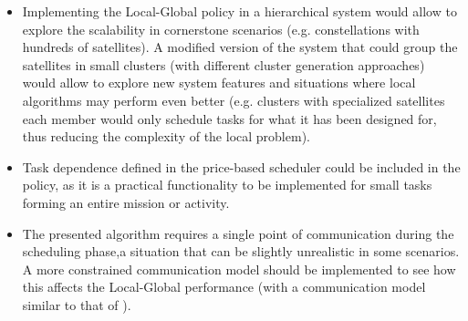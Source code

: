 \begin{itemize}
\item Implementing the Local-Global policy in a hierarchical system would allow to explore the scalability in cornerstone scenarios (e.g. constellations with hundreds of satellites). A modified version of the system that could group the satellites in small clusters (with different cluster generation approaches) would allow to explore new system features and situations where local algorithms may perform even better (e.g. clusters with specialized satellites each member would only schedule tasks for what it has been designed for, thus reducing the complexity of the local problem).

\item Task dependence defined in the price-based scheduler could be included in the policy, as it is a practical functionality to be implemented for small tasks forming an entire mission or activity.

\item The presented algorithm requires a single point of communication during the scheduling phase,a situation that can be slightly unrealistic in some scenarios. A more constrained communication model should be implemented to see how this affects the Local-Global performance (with a communication model similar to that of \cite{bonnet2008coordination}).
\end{itemize}